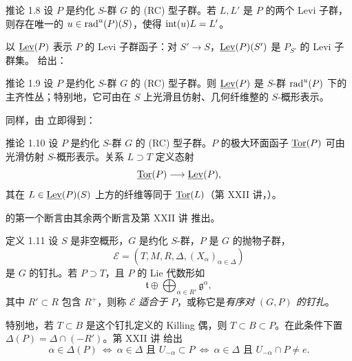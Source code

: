 \begin{sgastatement}{推论 1.8}
设 \(P\) 是约化 \(S\)-群 \(G\) 的 \textup{(RC)} 型子群。若 \(L,L'\) 是 \(P\) 的两个 Levi 子群，则存在唯一的 \(u\in\operatorname{rad}^u(P)(S)\)，使得 \(\operatorname{int}(u)L=L'\)。
\end{sgastatement}

以 \(\underline{\operatorname{Lev}}(P)\) 表示 \(P\) 的 Levi 子群函子：对 \(S'\to S\)，\(\underline{\operatorname{Lev}}(P)(S')\) 是 \(P_{S'}\) 的 Levi 子群集。 给出：

\begin{sgastatement}{推论 1.9}
设 \(P\) 是约化 \(S\)-群 \(G\) 的 \textup{(RC)} 型子群。则 \(\underline{\operatorname{Lev}}(P)\) 是 \(S\)-群 \(\operatorname{rad}^u(P)\) 下的主齐性丛；特别地，它可由在 \(S\) 上光滑且仿射、几何纤维整的 \(S\)-概形表示。
\end{sgastatement}

同样，由  立即得到：
\begin{sgastatement}{推论 1.10}
设 \(P\) 是约化 \(S\)-群 \(G\) 的 \textup{(RC)} 型子群。\(P\) 的极大环面函子 \(\underline{\operatorname{Tor}}(P)\) 可由光滑仿射 \(S\)-概形表示。关系 \(L\supset T\) 定义态射
\[
 \underline{\operatorname{Tor}}(P)\longrightarrow\underline{\operatorname{Lev}}(P),
\]
其在 \(L\in\underline{\operatorname{Lev}}(P)(S)\) 上方的纤维等同于 \(\underline{\operatorname{Tor}}(L)\)（第 XXII 讲，）。
\end{sgastatement}

 的第一个断言由其余两个断言及第 XXII 讲  推出。

\begin{sgastatement}{定义 1.11}
设 \(S\) 是非空概形，\(G\) 是约化 \(S\)-群，\(P\) 是 \(G\) 的抛物子群，
\[
 \mathcal E=(T,M,R,\Delta,(X_\alpha)_{\alpha\in\Delta})
\]
是 \(G\) 的钉扎。若 \(P\supset T\)，且 \(P\) 的 Lie 代数形如
\[
 \mathfrak t\oplus\bigoplus_{\alpha\in R'}\mathfrak g^\alpha,
\]
其中 \(R'\subset R\) 包含 \(R^+\)，则称 \(\mathcal E\) \emph{适合于} \(P\)，或称它是\emph{有序对 \((G,P)\) 的钉扎}。
\end{sgastatement}

特别地，若 \(T\subset B\) 是这个钉扎定义的 Killing 偶，则 \(T\subset B\subset P\)。在此条件下置 \(\Delta(P)=\Delta\cap(-R')\)。第 XXII 讲  给出
\[
 \alpha\in\Delta(P)
 \ \Longleftrightarrow\
 \alpha\in\Delta\text{ 且 }U_{-\alpha}\subset P
 \ \Longleftrightarrow\
 \alpha\in\Delta\text{ 且 }U_{-\alpha}\cap P\ne e.
\]

